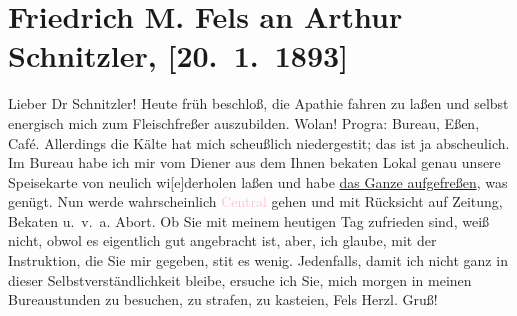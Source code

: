 

               \section[Friedrich M. Fels an Arthur Schnitzler, {[}20. 1. 1893{]}]{ Friedrich M. Fels an Arthur Schnitzler, {[}20. 1. 1893{]}}\nopagebreak{}\rehead{ }\normalsize\beginnumbering{} \toendnotes[C]{\smallbreak\pagebreak[2]} 
\toendnotes[C]{\smallbreak}\pstart
           \noindent{}{\pb}Lieber Dr Schnitzler! Heute früh beschloß, die Apathie fahren
                    zu laßen und selbst energisch mich zum Fleischfreßer auszubilden. Wolan!
                        Progra{\geminationm}: Bureau, Eßen, Café. Allerdings die
                    Kälte hat mich scheußlich niedergesti{\geminationm}t; das ist
                    ja abscheulich. Im Bureau habe ich mir vom Diener aus dem Ihnen beka{\geminationn}ten Lokal genau unsere Speisekarte von neulich
                        wi{[}e{]}derholen laßen und habe \uline{das Ganze aufgefreßen}, was genügt. Nun werde wahrscheinlich
                        \textcolor{pink}{Central}{}\ledrightnote{\textcolor{pink}{Café Central}} gehen und mit Rücksicht auf
                    Zeitung, Beka{\geminationn}ten u. v. a. Abort.\pend
           \pstart
           Ob Sie mit meinem heutigen Tag zufrieden sind, weiß \label{T_L00160_1v}\label{T_L00160_1h} nicht, obwol es
                    eigentlich \introOben{}gut\introOben{} angebracht ist, aber, ich glaube, mit
                    der Instruktion, die Sie mir gegeben, sti{\geminationm}t es
                    wenig.\pend
           \pstart
           Jedenfalls, damit ich nicht ganz in dieser Selbstverständlichkeit bleibe, ersuche
                    ich Sie, mich morgen in meinen Bureaustunden zu besuchen, zu strafen, zu
                    kasteien,\pend
           \pstart \spacefill\mbox{Fels}\pend{}\pstart
           \noindent{}Herzl. Gruß!\pend
           \endnumbering{}  
      